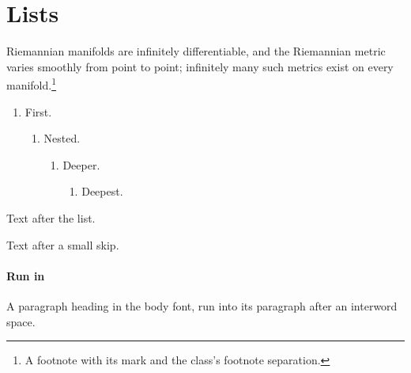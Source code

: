 \documentclass[12pt]{amsart}
\begin{document}
\section{Lists}
Riemannian manifolds are infinitely differentiable, and the Riemannian metric varies smoothly from point to point; infinitely many such metrics exist on every manifold.\footnote{A footnote with its mark and the class's footnote separation.}
\begin{enumerate}
\item First.
\begin{enumerate}
\item Nested.
\begin{enumerate}
\item Deeper.
\begin{enumerate}
\item Deepest.
\end{enumerate}
\end{enumerate}
\end{enumerate}
\end{enumerate}
Text after the list.

\smallskip
Text after a small skip.
\bigskip

\paragraph{Run in} A paragraph heading in the body font, run into its paragraph after an interword space.
\end{document}
